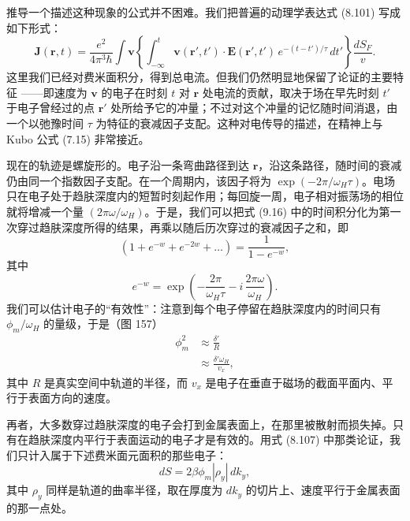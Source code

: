 推导一个描述这种现象的公式并不困难。我们把普遍的动理学表达式 (8.101) 写成如下形式：
\begin{equation*}
\mathbf{J}(\mathbf{r},t)=\frac{e^{2}}{4\pi^{3}\hbar}\int\mathbf{v}\left\{\int_{-\infty}^{t}\mathbf{v}(\mathbf{r}',t')\cdot\mathbf{E}(\mathbf{r}',t')\,e^{-(t-t')/\tau}\,dt'\right\}\frac{dS_F}{v}. \tag{9.16}
\end{equation*}
这里我们已经对费米面积分，得到总电流。但我们仍然明显地保留了论证的主要特征
——即速度为 $\mathbf{v}$ 的电子在时刻 $t$ 对 $\mathbf{r}$ 处电流的贡献，取决于场在早先时刻 $t'$ 于电子曾经过的点 $\mathbf{r}'$ 处所给予它的冲量；不过对这个冲量的记忆随时间消退，由一个以弛豫时间 $\tau$ 为特征的衰减因子支配。这种对电传导的描述，在精神上与 Kubo 公式 (7.15) 非常接近。

现在的轨迹是螺旋形的。电子沿一条弯曲路径到达 $\mathbf{r}$，沿这条路径，随时间的衰减仍由同一个指数因子支配。在一个周期内，该因子将为 $\exp(-2\pi/\omega_H\tau)$。电场只在电子处于趋肤深度内的短暂时刻起作用；每回旋一周，电子相对振荡场的相位就将增减一个量 $(2\pi\omega/\omega_H)$。于是，我们可以把式 (9.16) 中的时间积分化为第一次穿过趋肤深度所得的结果，再乘以随后历次穿过的衰减因子之和，即
\begin{equation*}
(1+e^{-w}+e^{-2w}+\ldots)=\frac{1}{1-e^{-w}}, \tag{9.17}
\end{equation*}
其中
\begin{equation*}
e^{-w}=\exp\left(-\frac{2\pi}{\omega_H\tau}-i\,\frac{2\pi\omega}{\omega_H}\right). \tag{9.18}
\end{equation*}
我们可以估计电子的“有效性”：注意到每个电子停留在趋肤深度内的时间只有 $\phi_m/\omega_H$ 的量级，于是（图 157）
\begin{align*}
\phi_m^{2}&\approx\frac{\delta'}{R}\\
&\approx\frac{\delta'\omega_H}{v_x}, \tag{9.19}
\end{align*}
其中 $R$ 是真实空间中轨道的半径，而 $v_x$ 是电子在垂直于磁场的截面平面内、平行于表面方向的速度。

再者，大多数穿过趋肤深度的电子会打到金属表面上，在那里被散射而损失掉。只有在趋肤深度内平行于表面运动的电子才是有效的。用式 (8.107) 中那类论证，我们只计入属于下述费米面元面积的那些电子：
\begin{equation*}
dS=2\beta\phi_m|\rho_y|\,dk_y, \tag{9.20}
\end{equation*}
其中 $\rho_y$ 同样是轨道的曲率半径，取在厚度为 $dk_y$ 的切片上、速度平行于金属表面的那一点处。

